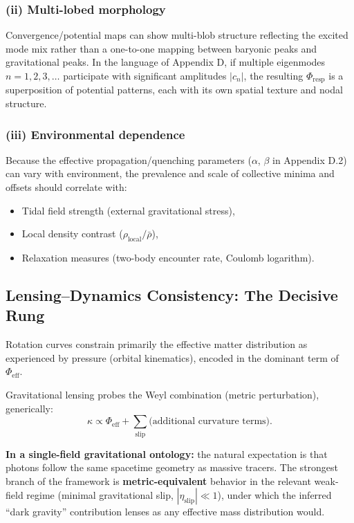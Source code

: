 \documentclass[11pt]{article}
\begin{document}
\subsubsection{(ii) Multi-lobed morphology}

Convergence/potential maps can show multi-blob structure reflecting the excited mode mix 
rather than a one-to-one mapping between baryonic peaks and gravitational peaks. In the 
language of Appendix D, if multiple eigenmodes $n = 1, 2, 3, \ldots$ participate with 
significant amplitudes $|c_n|$, the resulting $\Phi_{\text{resp}}$ is a superposition of 
potential patterns, each with its own spatial texture and nodal structure.

\subsubsection{(iii) Environmental dependence}

Because the effective propagation/quenching parameters ($\alpha$, $\beta$ in Appendix D.2) 
can vary with environment, the prevalence and scale of collective minima and offsets should 
correlate with:
\begin{itemize}
  \item Tidal field strength (external gravitational stress),
  \item Local density contrast ($\rho_{\text{local}} / \bar{\rho}$),
  \item Relaxation measures (two-body encounter rate, Coulomb logarithm).
\end{itemize}

\subsection{Lensing--Dynamics Consistency: The Decisive Rung}\label{e.7-lensing-dynamics-consistency}

Rotation curves constrain primarily the effective matter distribution as experienced by 
pressure (orbital kinematics), encoded in the dominant term of $\Phi_{\text{eff}}$.

Gravitational lensing probes the Weyl combination (metric perturbation), generically:
\begin{equation}
  \kappa \propto \Phi_{\text{eff}} + \sum_{\text{slip}} \text{(additional curvature terms)}.
\label{eq:lensing-convergence}
\end{equation}

\textbf{In a single-field gravitational ontology:} the natural expectation is that photons 
follow the same spacetime geometry as massive tracers. The strongest branch of the framework 
is \textbf{metric-equivalent} behavior in the relevant weak-field regime (minimal gravitational 
slip, $|\eta_{\text{slip}}| \ll 1$), under which the inferred ``dark gravity'' contribution 
lenses as any effective mass distribution would.
\end{document}

